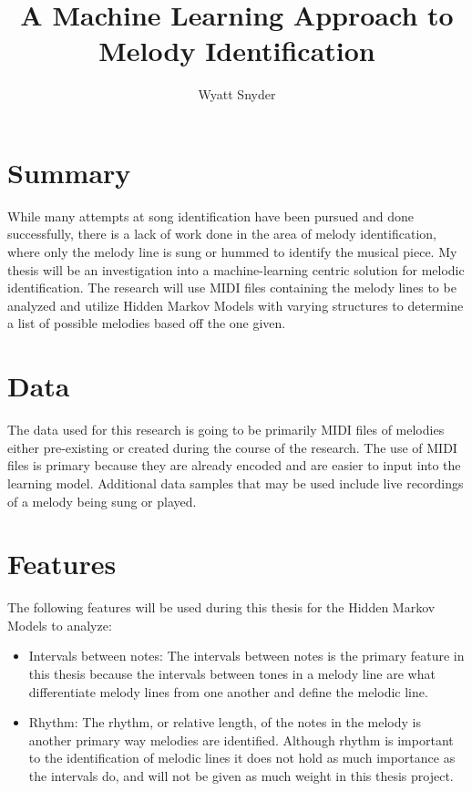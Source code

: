 \documentclass{article}
\title{A Machine Learning Approach to Melody Identification}
\author{Wyatt Snyder}
\begin{document}
	\maketitle
	\section{Summary}
	While many attempts at song identification have been pursued and done successfully,
	there is a lack of work done in the area of melody identification, where only the melody
	line is sung or hummed to identify the musical piece. My thesis will be an investigation
	into a machine-learning centric solution for melodic identification. The research will use 
	MIDI files containing the melody lines to be analyzed and utilize Hidden Markov Models with
	varying structures to determine a list of possible melodies based off the one given.
	
	\section{Data}
	The data used for this research is going to be primarily MIDI files of melodies either 
	pre-existing or created during the course of the research. The use of MIDI files is primary 
	because they are already encoded and are easier to input into the learning model. Additional 
	data samples that may be used include live recordings of a melody being sung or played.
	
	\section{Features}
	The following features will be used during this thesis for the Hidden Markov Models to analyze:
	\begin{itemize}
		\item Intervals between notes: The intervals between notes is the primary feature in this 
		thesis because the intervals between tones in a melody line are what differentiate melody lines 
		from one another and define the melodic line. 
		
		\item Rhythm: The rhythm, or relative length, of the notes in the melody is another primary way 
		melodies are identified. Although rhythm is important to the identification of melodic lines
		it does not hold as much importance as the intervals do, and will not be given as
		much weight in this thesis project.
	\end{itemize} 
	
\end{document}
